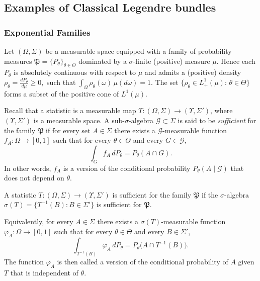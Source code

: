 \documentclass[12pt]{amsart}
\begin{document}
\subsection{Examples of Classical Legendre bundles}

\subsubsection{Exponential Families} Let $(\Omega, \Sigma)$ be a measurable space equipped with a family of probability measures $\mathfrak{P} = \{P_\theta\}_{\theta \in \Theta}$
dominated by a $\sigma$-finite (positive) measure $\mu$. Hence each $P_\theta$ is absolutely continuous with respect to $\mu$ and admits a (positive) density
$\rho_\theta = \frac{dP_\theta}{d\mu}\geq 0,$ such that $\int_{\Omega} \rho_\theta(\omega)\, \mu(d\omega)=1.$
The set $\{\rho_{\theta} \in L^1_+(\mu): \, \theta\in \Theta\}$ forms a subset of the positive cone of $L^1(\mu)$.


Recall that a statistic is a measurable map $T:({\Omega},\Sigma)\to ({\Upsilon},\Sigma')$, where $({\Upsilon},\Sigma')$ is a measurable space. 
A sub-$\sigma$-algebra $\mathscr{G} \subset \Sigma$ is said to be \emph{sufficient} for the family $\mathfrak{P}$ if for every set $A \in \Sigma$ there exists a $\mathscr{G}$-measurable function $f_A : {\Omega} \to [0,1]$ such that for every $\theta \in \Theta$ and every $G \in \mathscr{G}$,
\[
\int_G f_A \, dP_\theta = P_\theta(A \cap G).
\]
In other words, $f_A$ is a version of the conditional probability $P_\theta(A \mid \mathscr{G})$ that does not depend on $\theta$.


A statistic $T : ({\Omega}, \Sigma) \to ({\Upsilon}, \Sigma')$ is sufficient for the family $\mathfrak{P}$ if the $\sigma$-algebra $\sigma(T) = \{T^{-1}(B) : B \in \Sigma'\}$ is sufficient for $\mathfrak{P}$.

Equivalently, for every $A \in \Sigma$ there exists a $\sigma(T)$-measurable function $\varphi_A : \Omega \to [0,1]$ such that for every $\theta \in \Theta$ and every $B \in \Sigma'$,
\[
\int_{T^{-1}(B)} \varphi_A \, dP_\theta 
= P_\theta\bigl(A \cap T^{-1}(B)\bigr).
\]
The function $\varphi_A$ is then called a version of the conditional probability of $A$ given $T$ that is independent of $\theta$.
\end{document}

